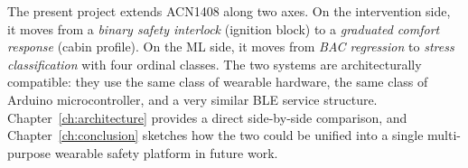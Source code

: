 The present project extends ACN1408 along two axes. On the
intervention side, it moves from a \emph{binary safety interlock}
(ignition block) to a \emph{graduated comfort response} (cabin
profile). On the ML side, it moves from \emph{BAC regression} to
\emph{stress classification} with four ordinal classes. The two
systems are architecturally compatible: they use the same class of
wearable hardware, the same class of Arduino microcontroller, and a
very similar BLE service structure. Chapter~\ref{ch:architecture} provides a direct side-by-side
comparison, and Chapter~\ref{ch:conclusion} sketches how the two could
be unified into a single multi-purpose wearable safety platform
in future work.
